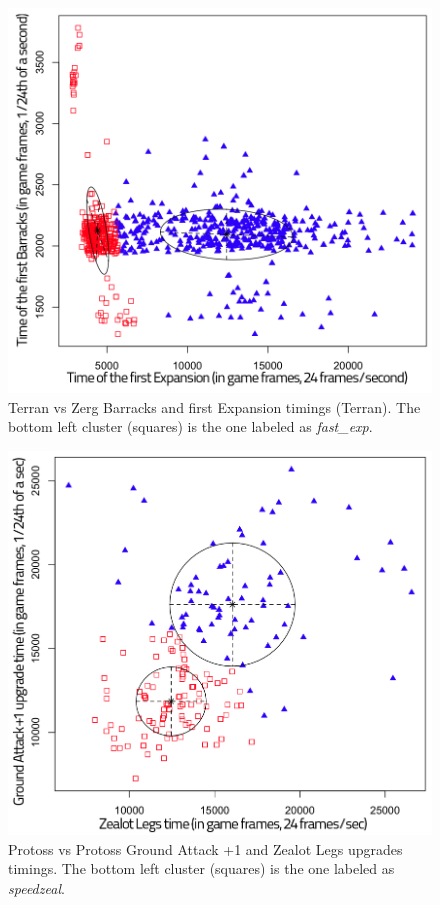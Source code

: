 \begin{figure}[htp]
\centerline{\includegraphics[width=0.9\columnwidth]{images/TvZraxFE.png}}
\caption{Terran vs Zerg Barracks and first Expansion timings (Terran). The bottom left cluster (squares) is the one labeled as \textit{fast\_exp}.}
\label{TvZraxFE}
\end{figure}

\begin{figure}[htp]
\centerline{\includegraphics[width=0.9\columnwidth]{images/PvPspeedzeal.png}}
\caption{Protoss vs Protoss Ground Attack +1 and Zealot Legs upgrades timings. The bottom left cluster (squares) is the one labeled as \textit{speedzeal}.}
\label{PvPspeedzeal}
\end{figure}


